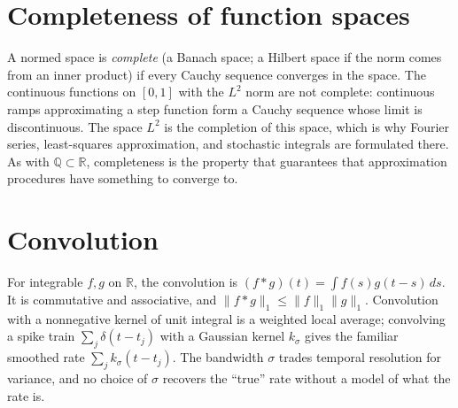 \section{Completeness of function spaces}
A normed space is \emph{complete} (a Banach space; a Hilbert space if the norm comes from an inner product) if every Cauchy sequence converges in the space. The continuous functions on $[0,1]$ with the $L^2$ norm are not complete: continuous ramps approximating a step function form a Cauchy sequence whose limit is discontinuous. The space $L^2$ is the completion of this space, which is why Fourier series, least-squares approximation, and stochastic integrals are formulated there. As with $\mathbb Q\subset\mathbb R$, completeness is the property that guarantees that approximation procedures have something to converge to.

\section{Convolution}
For integrable $f,g$ on $\mathbb R$, the convolution is $(f\ast g)(t)=\int f(s)g(t-s)\,ds$. It is commutative and associative, and $\|f\ast g\|_1\le\|f\|_1\|g\|_1$. Convolution with a nonnegative kernel of unit integral is a weighted local average; convolving a spike train $\sum_j\delta(t-t_j)$ with a Gaussian kernel $k_\sigma$ gives the familiar smoothed rate $\sum_jk_\sigma(t-t_j)$. The bandwidth $\sigma$ trades temporal resolution for variance, and no choice of $\sigma$ recovers the ``true'' rate without a model of what the rate is.

